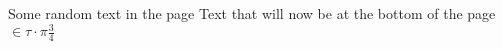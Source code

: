 \documentclass[a4paper]{article}
\begin{document}
Some random text in the page
\mbox{}
\vfill
Text that will now be at the bottom of the page
$\in \tau \cdot \pi \frac{3}{4}$
\end{document}
